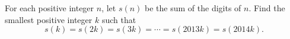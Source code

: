 For each positive integer $n$,  let $s(n)$ be the sum of the digits of $n$. Find the smallest positive integer $k$ such that\[s(k) = s(2k) = s(3k) = \cdots = s(2013k) = s(2014k).\]